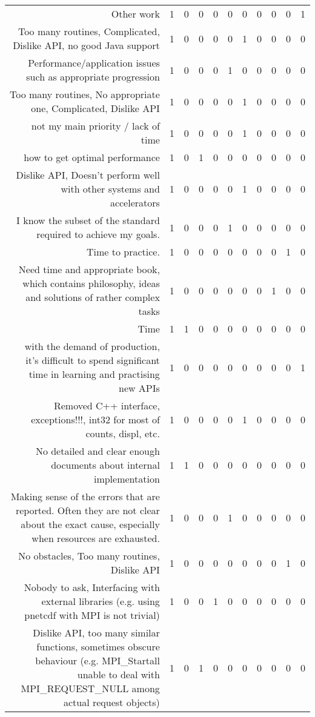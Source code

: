 {\begin{landscape}
\begin{longtable}[htb]{r|c|c|c|c|c|c|c|c|c|c}
{Other work} & 1 & 0 & 0 & 0 & 0 & 0 & 0 & 0 & 0 & 1 \\%
{Too many routines, Complicated, Dislike API, no good Java support} & 1 & 0 & 0 & 0 & 0 & 1 & 0 & 0 & 0 & 0 \\%
{Performance/application issues such as appropriate progression} & 1 & 0 & 0 & 0 & 1 & 0 & 0 & 0 & 0 & 0 \\%
{Too many routines, No appropriate one, Complicated, Dislike API} & 1 & 0 & 0 & 0 & 0 & 1 & 0 & 0 & 0 & 0 \\%
{not my main priority / lack of time} & 1 & 0 & 0 & 0 & 0 & 1 & 0 & 0 & 0 & 0 \\%
{how to get optimal performance} & 1 & 0 & 1 & 0 & 0 & 0 & 0 & 0 & 0 & 0 \\%
{Dislike API, Doesn't perform well with other systems and accelerators} & 1 & 0 & 0 & 0 & 0 & 1 & 0 & 0 & 0 & 0 \\%
{I know the subset of the standard required to achieve my goals.} & 1 & 0 & 0 & 0 & 1 & 0 & 0 & 0 & 0 & 0 \\%
{Time to practice.} & 1 & 0 & 0 & 0 & 0 & 0 & 0 & 0 & 1 & 0 \\%
{Need time and appropriate book, which contains philosophy, ideas and solutions of rather complex tasks} & 1 & 0 & 0 & 0 & 0 & 0 & 0 & 1 & 0 & 0 \\%
{Time} & 1 & 1 & 0 & 0 & 0 & 0 & 0 & 0 & 0 & 0 \\%
{with the demand of production, it's difficult to spend significant time in learning and practising new APIs} & 1 & 0 & 0 & 0 & 0 & 0 & 0 & 0 & 0 & 1 \\%
{Removed C++ interface, exceptions!!!, int32 for most of counts, displ, etc.} & 1 & 0 & 0 & 0 & 0 & 1 & 0 & 0 & 0 & 0 \\%
{No detailed and clear enough documents about internal implementation} & 1 & 1 & 0 & 0 & 0 & 0 & 0 & 0 & 0 & 0 \\%
{Making sense of the errors that are reported. Often they are not clear about the exact cause, especially when resources are exhausted.} & 1 & 0 & 0 & 0 & 1 & 0 & 0 & 0 & 0 & 0 \\%
{No obstacles, Too many routines, Dislike API} & 1 & 0 & 0 & 0 & 0 & 0 & 0 & 0 & 1 & 0 \\%
{Nobody to ask, Interfacing with external libraries (e.g. using pnetcdf with MPI is not trivial)} & 1 & 0 & 0 & 1 & 0 & 0 & 0 & 0 & 0 & 0 \\%
{Dislike API, too many similar functions, sometimes obscure behaviour (e.g. MPI\_Startall unable to deal with MPI\_REQUEST\_NULL among actual request objects)} & 1 & 0 & 1 & 0 & 0 & 0 & 0 & 0 & 0 & 0 \\%

\end{longtable}
\end{landscape}}
